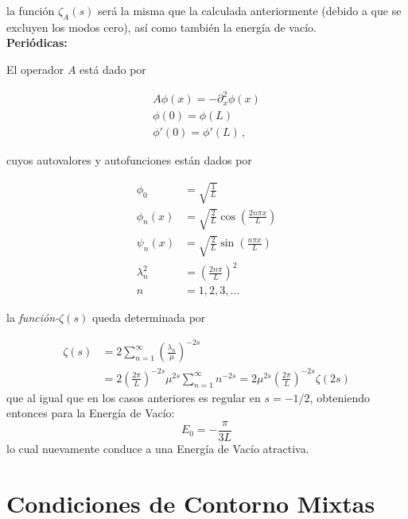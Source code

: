 la función $\zeta _A (s)$ será la misma que la calculada anteriormente (debido a que se excluyen los modos cero), así como también la energía de vacío. \\

\textbf{Periódicas:}

El operador $A$ está dado por

\begin{equation}
\begin{array}{c}
	A \phi (x) = - \partial _x ^2 \phi (x) \\[5pt]
    \phi (0) = \phi (L)  \\[5pt]
    \phi ' (0) = \phi ' (L) \, ,
\end{array}
\end{equation}

cuyos autovalores y autofunciones están dados por

\begin{equation}
\begin{aligned}
	\phi _{0} &= \sqrt{\frac{1}{L}} \\[5pt]
	\phi _{n} (x) &= \sqrt{\frac{2}{L}} \cos \left( \frac{2 n \pi x}{L} \right) \\[5pt]
	\psi _n (x) &=\sqrt{\frac{2}{L}} \sin \left( \frac{n \pi x}{L} \right) \\[5pt]
	\lambda _n ^2 &= \left( \frac{2 n \pi }{L} \right) ^2 \\[5pt]
	n &= 1,2,3, ...
\end{aligned}
\end{equation}

la {\it función-$\zeta  (s)$} queda determinada por

\begin{equation}
\begin{aligned}
\zeta  (s) &= 
2 \sum _{n=1} ^{\infty} \left( \frac{\lambda _n}{\mu} \right)^{-2s} \\[5pt]
&=  2 \left( \frac{2 \pi}{L} \right) ^{-2s} \mu ^{2s} \sum _{n=1} ^{\infty} n ^{-2s} =  
2 \mu ^{2s} \left( \frac{2 \pi}{L} \right) ^{-2s} \zeta (2s)
\end{aligned}
\end{equation}
que al igual que en los casos anteriores es regular en $s=-1/2$, obteniendo entonces para la Energía de Vacío:
\begin{equation}
E _0 = - \frac{\pi}{3 L}
\end{equation}
lo cual nuevamente conduce a una Energía de Vacío atractiva.

\section{Condiciones de Contorno Mixtas}


